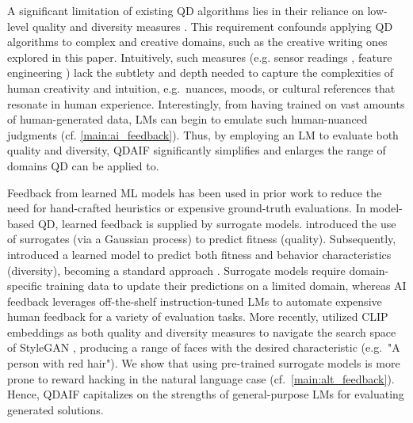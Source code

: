 A significant limitation of existing QD algorithms lies in their reliance on low-level quality and diversity measures \citep{mouret2015illuminating}. This requirement confounds applying QD algorithms to complex and creative domains, such as the creative writing ones explored in this paper. Intuitively, such measures (e.g. sensor readings \citep{cully2015robots}, feature engineering \citep{manning2009introduction}) lack the subtlety and depth needed to capture the complexities of human creativity and intuition, e.g.\ nuances, moods, or cultural references that resonate in human experience. Interestingly, from having trained on vast amounts of human-generated data, LMs can begin to emulate such human-nuanced judgments (cf. \cref{main:ai_feedback}). Thus, by employing an LM to evaluate both quality and diversity, QDAIF significantly simplifies and enlarges the range of domains QD can be applied to. 

Feedback from learned ML models has been used in prior work to reduce the need for hand-crafted heuristics or expensive ground-truth evaluations. In model-based QD, learned feedback is supplied by surrogate models. \citet{gaier2017data} introduced the use of surrogates (via a Gaussian process) to predict fitness (quality). Subsequently, \citet{keller2020model} introduced a learned model to predict both fitness and behavior characteristics (diversity), becoming a standard approach \citep{lim2021dynamics,lim2022learning,zhang2022deep,bhatt2022deep}. Surrogate models require domain-specific training data to update their predictions on a limited domain, whereas AI feedback leverages off-the-shelf instruction-tuned LMs \citep{chung2022scaling,ouyang2022training} to automate expensive human feedback for a variety of evaluation tasks. More recently, \citet{fontaine2021differentiable} utilized CLIP embeddings \citep{radford2021learning} as both quality and diversity measures to navigate the search space of StyleGAN \citep{karras2019style}, producing a range of faces with the desired characteristic (e.g.~"A person with red hair"). We show that using pre-trained surrogate models is more prone to reward hacking in the natural language case \citep{skalse2022defining,lehman2019surprising} (cf.~\cref{main:alt_feedback}). Hence, QDAIF capitalizes on the strengths of general-purpose LMs for evaluating generated solutions.


